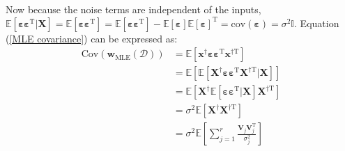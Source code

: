 \documentclass{article}
\begin{document}
Now because the noise terms are independent of the inputs, $\mathbb{E}[\boldsymbol{\varepsilon} \boldsymbol{\varepsilon}^{\mathrm{T}}|\mathbf{X}] = \mathbb{E}[\boldsymbol{\varepsilon} \boldsymbol{\varepsilon}^{\mathrm{T}}] = \mathbb{E}[\boldsymbol{\varepsilon} \boldsymbol{\varepsilon}^{\mathrm{T}}] - \mathbb{E}[\boldsymbol{\varepsilon}] \mathbb{E}[\boldsymbol{\varepsilon}]^{\mathrm{T}} = \text{cov}(\boldsymbol{\varepsilon}) = \sigma^{2}\mathbb{I}$. Equation (\ref{MLE covariance}) can be expressed as:
\begin{equation}
    \begin{aligned}
        \text{Cov}(\mathbf{w}_{\text{MLE}}(\mathcal{D})) 
        &= \mathbb{E}[\mathbf{x}^{\dag} \boldsymbol{\varepsilon} \boldsymbol{\varepsilon}^{\mathrm{T}} \mathbf{x}^{\dag \mathrm{T}} ]\\
        &= \mathbb{E}[\mathbb{E}[\mathbf{X}^{\dag} \boldsymbol{\varepsilon} \boldsymbol{\varepsilon}^{\mathrm{T}} \mathbf{X}^{\dag \mathrm{T}}|\mathbf{X}]]\\
        &= \mathbb{E}[\mathbf{X}^{\dag} \mathbb{E}[\boldsymbol{\varepsilon} \boldsymbol{\varepsilon}^{\mathrm{T}} |\mathbf{X}] \mathbf{X}^{\dag \mathrm{T}}]\\
        &= \sigma^2 \mathbb{E}[\mathbf{X}^{\dag} \mathbf{X}^{\dag \mathrm{T}}]\\
        &= \sigma^2 \mathbb{E}[\sum_{j=1}^{r} \frac{\mathbf{V}_j \mathbf{V}_j^{\mathrm{T}}}{\sigma_j^2}]
    \end{aligned}
\end{equation}
\end{document}

